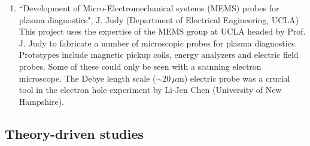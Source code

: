 \documentclass[11pt]{article}
\begin{document}
\begin{enumerate}
\item ``Development of Micro-Electromechanical systems (MEMS) probes for plasma diagnostics",
J. Judy (Department of Electrical Engineering, UCLA)
This project uses the expertise of the MEMS group at UCLA headed by Prof. J. Judy to fabricate a number of microscopic probes for plasma diagnostics.  Prototypes include magnetic pickup coils, energy analyzers and electric field probes.  Some of these could only be seen with a scanning electron microscope.  The Debye length scale ($\sim 20\, \mu$m) electric probe was a crucial tool in the electron hole experiment by Li-Jen Chen (University of New Hampshire).  

\end{enumerate}

\subsection{Theory-driven studies}
\end{document}
